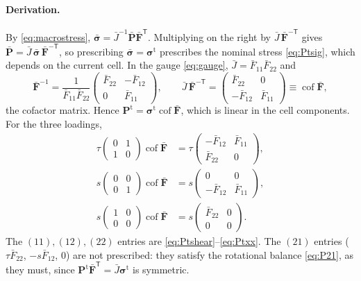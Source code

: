 \documentclass[11pt,a4paper]{article}
\newcommand{\Fb}{\bar{\mathbf F}}
\newcommand{\Pb}{\bar{\mathbf P}}
\newcommand{\sigb}{\bar{\bm\sigma}}
\newcommand{\Pt}{\mathbf P^{\mathrm t}}
\newcommand{\sigt}{\bm\sigma^{\mathrm t}}
\begin{document}
\paragraph{Derivation.}
By \eqref{eq:macrostress}, \(\sigb=\bar J^{-1}\Pb\Fb^{\mathsf T}\). Multiplying on the right by
\(\bar J\,\Fb^{-\mathsf T}\) gives \(\Pb=\bar J\,\sigb\,\Fb^{-\mathsf T}\), so prescribing \(\sigb=\sigt\)
prescribes the nominal stress \eqref{eq:Ptsig}, which depends on the current cell. In the gauge
\eqref{eq:gauge}, \(\bar J=\bar F_{11}\bar F_{22}\) and
\[
  \Fb^{-1}=\frac{1}{\bar F_{11}\bar F_{22}}\begin{pmatrix}\bar F_{22}&-\bar F_{12}\\0&\bar F_{11}\end{pmatrix},
  \qquad
  \bar J\,\Fb^{-\mathsf T}=\begin{pmatrix}\bar F_{22}&0\\-\bar F_{12}&\bar F_{11}\end{pmatrix}
  \equiv\operatorname{cof}\Fb ,
\]
the cofactor matrix. Hence \(\Pt=\sigt\operatorname{cof}\Fb\), which is linear in the cell components.
For the three loadings,
\begin{align*}
  \tau\begin{pmatrix}0&1\\1&0\end{pmatrix}\operatorname{cof}\Fb
   &=\tau\begin{pmatrix}-\bar F_{12}&\bar F_{11}\\ \bar F_{22}&0\end{pmatrix},\\
  s\begin{pmatrix}0&0\\0&1\end{pmatrix}\operatorname{cof}\Fb
   &=s\begin{pmatrix}0&0\\-\bar F_{12}&\bar F_{11}\end{pmatrix},\\
  s\begin{pmatrix}1&0\\0&0\end{pmatrix}\operatorname{cof}\Fb
   &=s\begin{pmatrix}\bar F_{22}&0\\0&0\end{pmatrix}.
\end{align*}
The \((11),(12),(22)\) entries are \eqref{eq:Ptshear}--\eqref{eq:Ptxx}. The \((21)\) entries
(\(\tau\bar F_{22}\), \(-s\bar F_{12}\), \(0\)) are not prescribed: they satisfy the rotational balance
\eqref{eq:P21}, as they must, since \(\Pt\Fb^{\mathsf T}=\bar J\sigt\) is symmetric.
\end{document}
